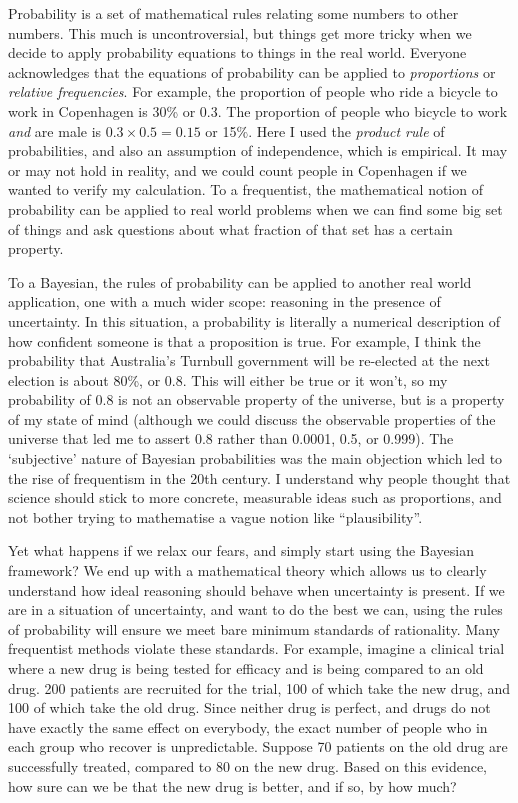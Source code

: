 \documentclass[a4paper, 12pt]{article}
\begin{document}
Probability is a set of mathematical rules relating some
numbers to other numbers. This much is uncontroversial, but things get more
tricky when we decide to apply probability equations to things in the real
world. Everyone acknowledges that the equations of probability can be applied
to {\em proportions} or {\em relative frequencies}. For example, the proportion
of people who ride a bicycle to work in Copenhagen is 30\% or 0.3.
The proportion of people who bicycle to work {\em and} are male is
$0.3 \times 0.5 = 0.15$ or 15$\%$. Here I used the {\em product rule} of
probabilities, and also an assumption of independence, which is empirical.
It may or may not hold in reality, and we could count people in Copenhagen if
we wanted to verify my calculation. To a frequentist, the mathematical notion
of probability can be applied to real world problems when we can find some
big set of things and ask questions about what fraction of that set has a
certain property.

To a Bayesian, the rules of probability can be applied to another real world
application, one with a much wider scope: reasoning in the presence of
uncertainty. In this situation, a probability is literally a numerical
description of how confident someone is that a proposition is true. For example,
I think the probability that Australia's Turnbull government will be
re-elected at the next election is about 80\%, or 0.8. This will either be true
or it won't, so my probability of 0.8 is not an observable property of
the universe, but is a property of my state of mind (although we could
discuss the observable properties of the universe that led me to assert 0.8
rather than 0.0001, 0.5, or 0.999). The `subjective' nature of Bayesian
probabilities was the main objection which led to the rise of frequentism in
the 20th century. I understand why people thought that science should stick
to more concrete, measurable ideas such as proportions, and not bother trying
to mathematise a vague notion like ``plausibility''.

Yet what happens if we relax our fears, and simply start using the Bayesian
framework? We end up with a mathematical theory which allows us to clearly
understand how ideal reasoning should behave when uncertainty is present. If we
are in a situation of uncertainty, and want to do the best we can, using the
rules of probability will ensure we meet bare minimum standards of rationality.
Many frequentist methods violate these standards.
For example, imagine a clinical trial where a new drug is being tested for
efficacy and is being compared to an old drug.
200 patients are recruited for the trial, 100
of which take the new drug, and 100 of which take the old drug. Since neither
drug is perfect, and drugs do not have exactly the same effect on everybody,
the exact number of people who in each group who recover is unpredictable.
Suppose 70 patients on the old drug are successfully treated, compared to
80 on the new drug. Based on this evidence, how sure can we be that the new
drug is better, and if so, by how much?
\end{document}
